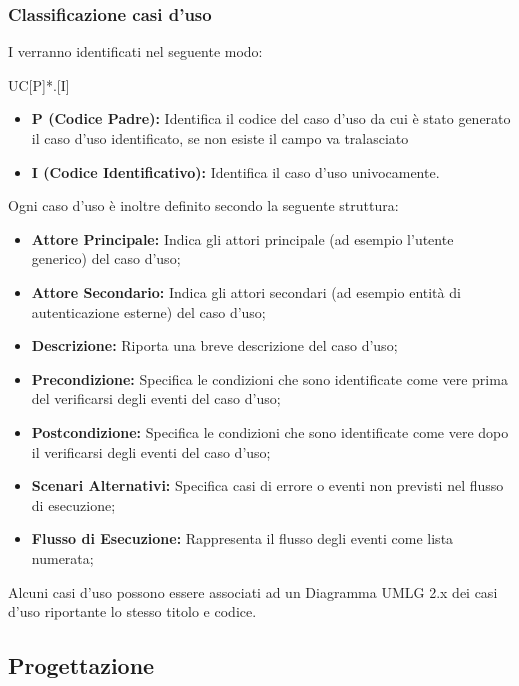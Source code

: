 \documentclass[../NomeDocumento.tex]{subfiles}
\begin{document}
	\subsubsection{Classificazione casi d’uso} 
	
	I  verranno identificati nel seguente modo: \centerline{UC[P]*.[I]}
	
	\begin{itemize}
		\item \textbf{P (Codice Padre):} Identifica il codice del caso d'uso da cui è stato generato il caso d'uso identificato, se non esiste il campo va tralasciato
		\item \textbf{I (Codice Identificativo):} Identifica il caso d'uso univocamente.
	\end{itemize}

	Ogni caso d'uso è inoltre definito secondo la seguente struttura:
	\begin{itemize}
		\item \textbf{Attore Principale:} Indica gli attori principale (ad esempio l'utente generico) del caso d'uso;
		\item \textbf{Attore Secondario:} Indica gli attori secondari (ad esempio entità di autenticazione esterne) del caso d'uso;
		\item \textbf{Descrizione:} Riporta una breve descrizione del caso d'uso;
		\item \textbf{Precondizione:} Specifica le condizioni che sono identificate come vere prima del verificarsi degli eventi del caso d'uso;
		\item \textbf{Postcondizione:} Specifica le condizioni che sono identificate come vere dopo il verificarsi degli eventi del caso d'uso;
		\item \textbf{Scenari Alternativi:} Specifica casi di errore o eventi non previsti nel flusso di esecuzione;
		\item \textbf{Flusso di Esecuzione:} Rappresenta il flusso degli eventi come lista numerata;
	\end{itemize}

	Alcuni casi d'uso possono essere associati ad un Diagramma UMLG 2.x dei casi d'uso
	riportante lo stesso titolo e codice.
	


	
	
\subsection{Progettazione} 
\end{document}
